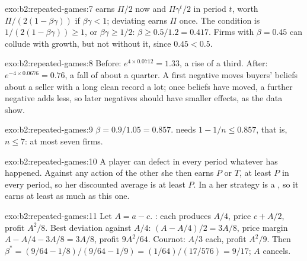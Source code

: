 \begin{solution}{exo:b2:repeated-games:7}
 earns $\Pi/2$ now and $\Pi\gamma^t/2$ in period $t$, worth $\Pi/(2(1 - \beta\gamma))$ if $\beta\gamma < 1$; deviating earns $\Pi$ once. The
condition is $1/(2(1 - \beta\gamma)) \ge 1$, or $\beta\gamma \ge 1/2$: $\beta \ge 0.5/1.2 = 0.417$. Firms with $\beta = 0.45$ can collude with growth,
but not without it, since $0.45 < 0.5$.
\end{solution}

\begin{solution}{exo:b2:repeated-games:8}
Before: $e^{4 \times 0.0712} = 1.33$, a rise of a third. After: $e^{-4 \times 0.0676} = 0.76$, a fall of about a quarter. A first
negative moves buyers' beliefs about a seller with a long clean record a lot; once beliefs have moved, a further
negative adds less, so later negatives should have smaller effects, as the data show.
\end{solution}

\begin{solution}{exo:b2:repeated-games:9}
$\beta = 0.9/1.05 = 0.857$.  needs $1 - 1/n \le 0.857$, that is, $n \le 7$: at most seven firms.
\end{solution}

\begin{solution}{exo:b2:repeated-games:10}
A player can defect in every period whatever has happened. Against any action of the other she then earns $P$ or
$T$, at least $P$ in every period, so her discounted average is at least $P$. In a  her strategy is
a , so it earns at least as much as this one.
\end{solution}

\begin{solution}{exo:b2:repeated-games:11}
Let $A = a - c$. : each produces $A/4$, price $c + A/2$, profit $A^2/8$. Best deviation against $A/4$: $(A - A/4)/2 =
3A/8$, price margin $A - A/4 - 3A/8 = 3A/8$, profit $9A^2/64$. Cournot: $A/3$ each, profit $A^2/9$. Then
$\beta^* = (9/64 - 1/8)/(9/64 - 1/9) = (1/64)/(17/576) = 9/17$; $A$ cancels.
\end{solution}

